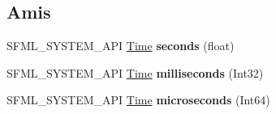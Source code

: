 \subsection*{Amis}
\begin{DoxyCompactItemize}
\item 
\mbox{\label{classsf_1_1Time_abe757d058fd820b4c84232c1451c1efa}} 
S\+F\+M\+L\+\_\+\+S\+Y\+S\+T\+E\+M\+\_\+\+A\+PI \hyperlink{classsf_1_1Time}{Time} {\bfseries seconds} (float)
\item 
\mbox{\label{classsf_1_1Time_a8dc1cb5f5fdde2ed2221d5af80cce853}} 
S\+F\+M\+L\+\_\+\+S\+Y\+S\+T\+E\+M\+\_\+\+A\+PI \hyperlink{classsf_1_1Time}{Time} {\bfseries milliseconds} (Int32)
\item 
\mbox{\label{classsf_1_1Time_ab4f5b719ece75ebd11593f935fbe3bcb}} 
S\+F\+M\+L\+\_\+\+S\+Y\+S\+T\+E\+M\+\_\+\+A\+PI \hyperlink{classsf_1_1Time}{Time} {\bfseries microseconds} (Int64)
\end{DoxyCompactItemize}
